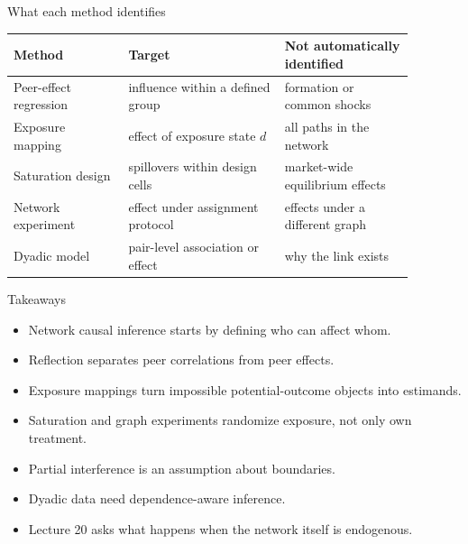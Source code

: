 \documentclass[aspectratio=169,11pt]{beamer}
\newcommand{\1}{\mathbf{1}}
\begin{document}
\begin{frame}{What each method identifies}
\small
\begin{tabular}{p{0.25\linewidth} p{0.34\linewidth} p{0.29\linewidth}}
\toprule
Method & Target & Not automatically identified \\
\midrule
Peer-effect regression & influence within a defined group & formation or common shocks \\
Exposure mapping & effect of exposure state \(d\) & all paths in the network \\
Saturation design & spillovers within design cells & market-wide equilibrium effects \\
Network experiment & effect under assignment protocol & effects under a different graph \\
Dyadic model & pair-level association or effect & why the link exists \\
\bottomrule
\end{tabular}
\end{frame}

\begin{frame}{Takeaways}
\begin{itemize}
    \item Network causal inference starts by defining who can affect whom.
    \item Reflection separates peer correlations from peer effects.
    \item Exposure mappings turn impossible potential-outcome objects into estimands.
    \item Saturation and graph experiments randomize exposure, not only own treatment.
    \item Partial interference is an assumption about boundaries.
    \item Dyadic data need dependence-aware inference.
    \item Lecture 20 asks what happens when the network itself is endogenous.
\end{itemize}
\end{frame}
\end{document}
